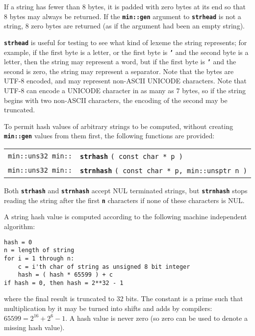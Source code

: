 \documentclass[12pt]{article}
\makeatletter
\newcommand{\TT}[1]{{\tt \bfseries #1}}
\newcommand{\ttindex}[1]{\index{#1@{\tt #1}}}
\newcommand{\minindex}[1]{\ttindex{min::#1}\ttindex{#1}}
\newenvironment{indpar}[1][0.3in]%
	{\begin{list}{}%
		     {\setlength{\itemsep}{0in}%
		      \setlength{\topsep}{0in}%
		      \setlength{\parsep}{1ex}%
		      \setlength{\labelwidth}{#1}%
		      \setlength{\leftmargin}{#1}%
		      \addtolength{\leftmargin}{\labelsep}}%
	 \item}%
	{\end{list}}
\newcommand{\LABEL}[1]{\label{#1}}
\newcommand{\MINKEY}[1]{{\tt \bf #1}\minindex{#1}}
\makeatother
\begin{document}
If a string has fewer than 8 bytes, it is padded with zero bytes
at its end so that 8 bytes may always be returned.  If the \TT{min::gen}
argument to \TT{strhead} is not a string, 8 zero bytes are returned
(as if the argument had been an empty string).

\TT{strhead} is useful for testing
to see what kind of lexeme the string represents; for
example, if the first byte is a letter, or the first byte is \TT{'}
and the second byte is a letter, then the string may represent a
word, but if the first byte is \TT{'} and the second is zero,
the string may represent a separator.
Note that the bytes are UTF-8 encoded, and may represent non-ASCII
UNICODE characters.  Note that UTF-8 can encode a UNICODE character
in as many as 7 bytes, so if the string begins with two non-ASCII
characters, the encoding of the second may be truncated.

To permit hash values of arbitrary strings to be computed,
without creating \TT{min::gen} values from them first,
the following functions are provided:

\begin{indpar}\begin{tabular}{r@{}l}
\verb|min::uns32 min::| & \MINKEY{strhash} \verb|( const char * p )|
\LABEL{MIN::STRHASH} \\
\verb|min::uns32 min::|
    & \MINKEY{strnhash} \verb|( const char * p, min::unsptr n )|
\LABEL{MIN::STRNHASH} \\
\end{tabular}\end{indpar}

Both \TT{strhash} and \TT{strnhash} accept NUL terminated strings, but
\TT{strnhash} stops reading the string after the first \TT{n} characters
if none of these characters is NUL.

A string hash value is computed according to the following machine
independent algorithm:\label{HASH-ALGORITHM}

\begin{indpar}\begin{verbatim}
hash = 0
n = length of string
for i = 1 through n:
    c = i'th char of string as unsigned 8 bit integer
    hash = ( hash * 65599 ) + c
if hash = 0, then hash = 2**32 - 1
\end{verbatim}\end{indpar}

where the final result is truncated to 32 bits.  The constant
is a prime such that multiplication by it may be turned into
shifts and adds by compilers: $65599=2^{16}+2^6-1$.
A hash value is never zero (so zero can be used to denote a missing hash value).
\end{document}
